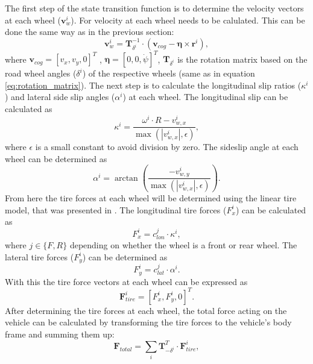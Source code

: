 The first step of the state transition function is to determine the velocity vectors at each wheel ($\mathbf{v}_w^i$). For velocity at each wheel needs to be calulated. This can be done the same way as in the previous section:
\begin{equation}
    \mathbf{v}_{w}^{i} = \mathbf{T}_{\delta^i}^{-1} \cdot (\mathbf{v}_{cog} - \boldsymbol{\eta} \times \mathbf{r}^i),
\end{equation}
where $\mathbf{v}_{cog} = [v_x, v_y, 0]^T$ , $\boldsymbol{\eta} = [0,0,\dot \psi]^T$, $\mathbf{T}_{\delta^i}$ is the rotation matrix based on the road wheel angles ($\delta^i$) of the respective wheels (same as in equation \ref{eq:rotation_matrix}). 
The next step is to calculate the longitudinal slip ratios ($\kappa^i$) and lateral side slip angles ($\alpha^i$) at each wheel. The longitudinal slip can be calculated as
\begin{equation}
    \kappa^i = \frac{\omega^i \cdot R - v_{w,x}^i}{\max(|v_{w,x}^i|, \epsilon)},
\end{equation}
where $\epsilon$ is a small constant to avoid division by zero. The sideslip angle at each wheel can be determined as
\begin{equation}
    \alpha^i = \arctan\left(\frac{-v_{w,y}^i}{\max(|v_{w,x}^i|, \epsilon)}\right).
\end{equation}
From here the tire forces at each wheel will be determined using the linear tire model, that was presented in \cite{Rajesh_Vehicle_Dynamics}. The longitudinal tire forces ($F_{x}^i$) can be calculated as
\begin{equation}
    F_{x}^i = c_{lon}^j \cdot \kappa^i,
\end{equation}
where $j \in \{F, R\}$ depending on whether the wheel is a front or rear wheel. The lateral tire forces ($F_{y}^i$) can be determined as
\begin{equation}
    F_{y}^i = c_{lat}^j \cdot \alpha^i.
\end{equation}
With this the tire force vectors at each wheel can be expressed as
\begin{equation}
    \mathbf{F}_{tire}^i = [F_{x}^i, F_{y}^i, 0]^T.
\end{equation}
After determining the tire forces at each wheel, the total force acting on the vehicle can be calculated by transforming the tire forces to the vehicle's body frame and summing them up:
\begin{equation}
    \mathbf{F}_{total} = \sum_{i} \mathbf{T}_{-\delta^i}^T \cdot \mathbf{F}_{tire}^i,  
\end{equation}
